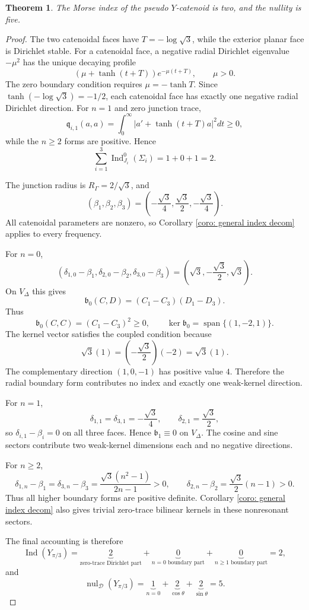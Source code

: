 \documentclass[11pt,twoside]{amsart}
\newtheorem{thm}{Theorem}[section]
\numberwithin{equation}{section}
\begin{document}
\begin{thm} \label{thm: index pseudo y-cat}
The Morse index of the pseudo $Y$-catenoid is two, and the nullity is five.
\end{thm}
\begin{proof}
The two catenoidal faces have $T=-\log\sqrt3$, while the exterior planar face is Dirichlet stable. For a catenoidal face, a negative radial Dirichlet eigenvalue $-\mu^2$ has the unique decaying profile
\[
(\mu+\tanh(t+T))e^{-\mu(t+T)},
\qquad \mu>0.
\]
The zero boundary condition requires $\mu=-\tanh T$. Since $\tanh(-\log\sqrt3)=-1/2$, each catenoidal face has exactly one negative radial Dirichlet direction. For $n=1$ and zero junction trace,
\[
\mathfrak q_{i,1}(a,a)=\int_0^\infty
\left|a'+\tanh(t+T)a\right|^2dt\ge0,
\]
while the $n\ge2$ forms are positive. Hence
\[
\sum_{i=1}^3\operatorname{Ind}_{J_i}^0(\Sigma_i)=1+0+1=2.
\]

The junction radius is $R_\Gamma=2/\sqrt3$, and
\[
(\beta_1,\beta_2,\beta_3)
=\left(-\frac{\sqrt3}{4},\frac{\sqrt3}{2},-\frac{\sqrt3}{4}\right).
\]
All catenoidal parameters are nonzero, so Corollary \ref{coro: general index decom} applies to every frequency.

For $n=0$,
\[
(\delta_{1,0}-\beta_1,\delta_{2,0}-\beta_2,\delta_{3,0}-\beta_3)
=\left(\sqrt3,-\frac{\sqrt3}{2},\sqrt3\right).
\]
On $V_\Delta$ this gives
\[
\mathfrak b_0(C,D)=(C_1-C_3)(D_1-D_3).
\]
Thus
\[
\mathfrak b_0(C,C)=(C_1-C_3)^2\ge0,
\qquad
\ker\mathfrak b_0=\operatorname{span}\{(1,-2,1)\}.
\]
The kernel vector satisfies the coupled condition because
\[
\sqrt3(1)=\left(-\frac{\sqrt3}{2}\right)(-2)=\sqrt3(1).
\]
The complementary direction $(1,0,-1)$ has positive value $4$. Therefore the radial boundary form contributes no index and exactly one weak-kernel direction.

For $n=1$,
\[
\delta_{1,1}=\delta_{3,1}=-\frac{\sqrt3}{4},
\qquad
\delta_{2,1}=\frac{\sqrt3}{2},
\]
so $\delta_{i,1}-\beta_i=0$ on all three faces. Hence $\mathfrak b_1\equiv0$ on $V_\Delta$. The cosine and sine sectors contribute two weak-kernel dimensions each and no negative directions.

For $n\ge2$,
\[
\delta_{1,n}-\beta_1=\delta_{3,n}-\beta_3
=\frac{\sqrt3(n^2-1)}{2n-1}>0,
\qquad
\delta_{2,n}-\beta_2=\frac{\sqrt3}{2}(n-1)>0.
\]
Thus all higher boundary forms are positive definite. Corollary \ref{coro: general index decom} also gives trivial zero-trace bilinear kernels in these nonresonant sectors.

The final accounting is therefore
\[
\operatorname{Ind}(Y_{\pi/3})
=\underbrace{2}_{\text{zero-trace Dirichlet part}}
+\underbrace{0}_{n=0\text{ boundary part}}
+\underbrace{0}_{n\ge1\text{ boundary part}}
=2,
\]
and
\[
\operatorname{nul}_{\mathcal D}(Y_{\pi/3})
=\underbrace{1}_{n=0}
+\underbrace{2}_{\cos\theta}
+\underbrace{2}_{\sin\theta}
=5.
\]
\end{proof}
\end{document}
